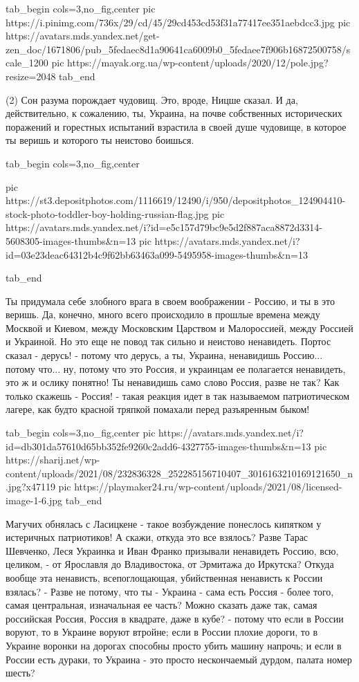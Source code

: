 \ifcmt
  tab_begin cols=3,no_fig,center
     pic https://i.pinimg.com/736x/29/cd/45/29cd453cd53f31a77417ee351aebdcc3.jpg
		 pic https://avatars.mds.yandex.net/get-zen_doc/1671806/pub_5fedaec8d1a90641ca6009b0_5fedaee7f906b16872500758/scale_1200
		 pic https://mayak.org.ua/wp-content/uploads/2020/12/pole.jpg?resize=2048%
  tab_end
\fi

(2) Сон разума порождает чудовищ. Это, вроде, Ницше сказал. И да,
действительно, к сожалению, ты, Украина, на почве собственных исторических
поражений и горестных испытаний взрастила в своей душе чудовище, в которое ты
веришь и которого ты неистово боишься. 

\ifcmt
  tab_begin cols=3,no_fig,center

     pic https://st3.depositphotos.com/1116619/12490/i/950/depositphotos_124904410-stock-photo-toddler-boy-holding-russian-flag.jpg
		 pic https://avatars.mds.yandex.net/i?id=e5c157d79bc9e5d2f887aca8872d3314-5608305-images-thumbs&n=13
		 pic https://avatars.mds.yandex.net/i?id=03e23deac64312b4c9f62bb63463a099-5495958-images-thumbs&n=13

  tab_end
\fi

Ты придумала себе злобного врага в своем
воображении - Россию, и ты в это веришь. Да, конечно, много всего происходило в
прошлые времена между Москвой и Киевом, между Московским Царством и
Малороссией, между Россией и Украиной.  Но это еще не повод так сильно и
неистово ненавидеть. Портос сказал - дерусь! - потому что дерусь, а ты,
Украина, ненавидишь Россию... потому что... ну, потому что это Россия, и
украинцам ее полагается ненавидеть, это ж и ослику понятно! Ты ненавидишь само
слово Россия, разве не так? Как только скажешь - Россия! - такая реакция идет в
так называемом патриотическом лагере, как будто красной тряпкой помахали перед
разъяренным быком! 

\ifcmt
  tab_begin cols=3,no_fig,center
     pic https://avatars.mds.yandex.net/i?id=db301da57610d65bb352fe9260c2add6-4327755-images-thumbs&n=13
		 pic https://sharij.net/wp-content/uploads/2021/08/232836328_252285156710407_3016163210169121650_n.jpg?x47119
		 pic https://playmaker24.ru/wp-content/uploads/2021/08/licensed-image-1-6.jpg
  tab_end
\fi

Магучих обнялась с Ласицкене - такое возбуждение понеслось
кипятком у истеричных патриотиков! А скажи, откуда это все взялось? Разве Тарас
Шевченко, Леся Украинка и Иван Франко призывали ненавидеть Россию, всю,
целиком, - от Ярославля до Владивостока, от Эрмитажа до Иркутска? Откуда вообще
эта ненависть, всепоглощающая, убийственная ненависть к России взялась? - Разве
не потому, что ты - Украина - сама есть Россия - более того, самая центральная,
изначальная ее часть? Можно сказать даже так, самая российская Россия, Россия в
квадрате, даже в кубе? - потому что если в России воруют, то в Украине воруют
втройне; если в России плохие дороги, то в Украине воронки на дорогах способны
просто убить машину напрочь; и если в России есть дураки, то Украина - это
просто нескончаемый дурдом, палата номер шесть?

